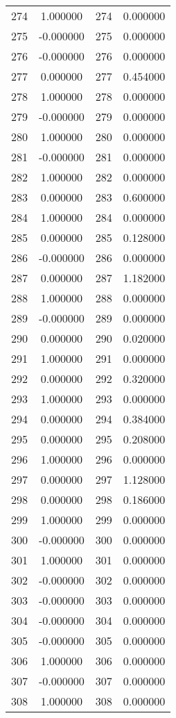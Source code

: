 \documentclass[12pt]{article}
\begin{document}
\begin{longtable}{@{}cccc@{}}
274 & 1.000000 & 274 & 0.000000 \\
275 & -0.000000 & 275 & 0.000000 \\
276 & -0.000000 & 276 & 0.000000 \\
277 & 0.000000 & 277 & 0.454000 \\
278 & 1.000000 & 278 & 0.000000 \\
279 & -0.000000 & 279 & 0.000000 \\
280 & 1.000000 & 280 & 0.000000 \\
281 & -0.000000 & 281 & 0.000000 \\
282 & 1.000000 & 282 & 0.000000 \\
283 & 0.000000 & 283 & 0.600000 \\
284 & 1.000000 & 284 & 0.000000 \\
285 & 0.000000 & 285 & 0.128000 \\
286 & -0.000000 & 286 & 0.000000 \\
287 & 0.000000 & 287 & 1.182000 \\
288 & 1.000000 & 288 & 0.000000 \\
289 & -0.000000 & 289 & 0.000000 \\
290 & 0.000000 & 290 & 0.020000 \\
291 & 1.000000 & 291 & 0.000000 \\
292 & 0.000000 & 292 & 0.320000 \\
293 & 1.000000 & 293 & 0.000000 \\
294 & 0.000000 & 294 & 0.384000 \\
295 & 0.000000 & 295 & 0.208000 \\
296 & 1.000000 & 296 & 0.000000 \\
297 & 0.000000 & 297 & 1.128000 \\
298 & 0.000000 & 298 & 0.186000 \\
299 & 1.000000 & 299 & 0.000000 \\
300 & -0.000000 & 300 & 0.000000 \\
301 & 1.000000 & 301 & 0.000000 \\
302 & -0.000000 & 302 & 0.000000 \\
303 & -0.000000 & 303 & 0.000000 \\
304 & -0.000000 & 304 & 0.000000 \\
305 & -0.000000 & 305 & 0.000000 \\
306 & 1.000000 & 306 & 0.000000 \\
307 & -0.000000 & 307 & 0.000000 \\
308 & 1.000000 & 308 & 0.000000 \\

\end{longtable}
\end{document}
